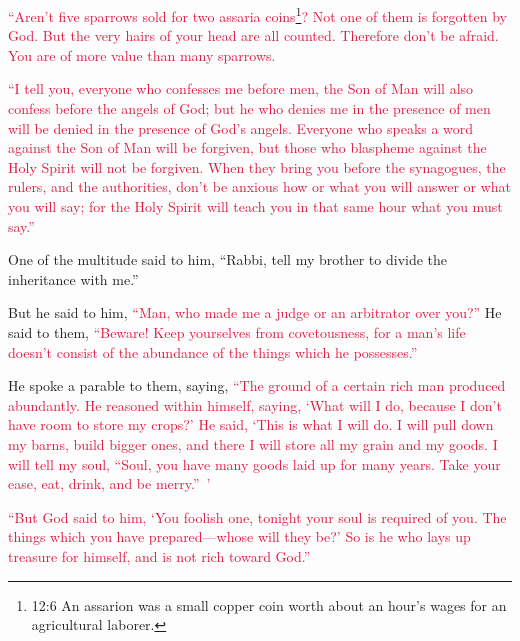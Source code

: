 \myverse{}\textcolor{crimson}{“Aren’t five sparrows sold for two assaria coins}\footnote{12:6 An assarion was a small copper coin worth about an hour’s wages for an agricultural laborer.}\textcolor{crimson}{?
	Not one of them is forgotten by God.
}
\myverse{}\textcolor{crimson}{But the very hairs of your head are all counted. Therefore don’t be afraid.
	You are of more value than many sparrows.}

\myverse{}\textcolor{crimson}{“I tell you, everyone who confesses me before men, the Son
	of Man will also confess before the angels of God;
}
\myverse{}\textcolor{crimson}{but he who denies me in the presence of men will be denied in the presence
	of God’s angels.
}
\myverse{}\textcolor{crimson}{Everyone who speaks a word against the Son of Man will be forgiven, but
	those who blaspheme against the Holy Spirit will not be forgiven.
}
\myverse{}\textcolor{crimson}{When they bring you before the synagogues, the rulers, and the authorities,
	don’t be anxious how or what you will answer or what you will say;
}
\myverse{}\textcolor{crimson}{for the Holy Spirit will teach you in that same hour what you must say.”}

\myverse{}One of the multitude said to him, “Rabbi, tell my brother to
divide the inheritance with me.”

\myverse{}But he said to him,
\textcolor{crimson}{“Man, who made me a judge or an arbitrator over you?”}
\myverse{}He said to them,
\textcolor{crimson}{“Beware! Keep yourselves from covetousness, for a man’s life doesn’t consist of the abundance of the
	things which he possesses.”}

\myverse{}He spoke a parable to them, saying,
\textcolor{crimson}{“The ground of a certain rich man produced abundantly.
}
\myverse{}\textcolor{crimson}{He reasoned within himself, saying, ‘What will I do, because I don’t
	have room to store my crops?’
}
\myverse{}\textcolor{crimson}{He said, ‘This is what I will do. I will pull down my barns, build bigger
	ones, and there I will store all my grain and my goods.
}
\myverse{}\textcolor{crimson}{I will tell my soul, “Soul, you have many goods laid up for many years.
	Take your ease, eat, drink, and be merry.” ’}

\myverse{}\textcolor{crimson}{“But God said to him, ‘You foolish one, tonight your soul
	is required of you. The things which you have prepared—whose will they be?’
}
\myverse{}\textcolor{crimson}{So is he who lays up treasure for himself, and is not rich toward God.”}

